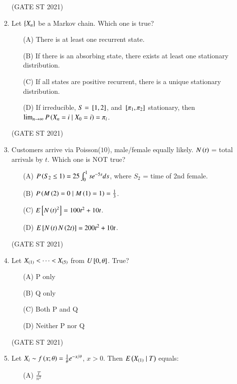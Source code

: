 \documentclass[journal,12pt,onecolumn]{IEEEtran}
\theoremstyle{remark}
\begin{document}
\begin{enumerate}
\hfill (GATE ST 2021) \\


\item
Let $\left\{X_n\right\}$ be a Markov chain. Which one is true?
\begin{enumerate}
\item[(A)] There is at least one recurrent state.
\item[(B)] If there is an absorbing state, there exists at least one stationary distribution.
\item[(C)] If all states are positive recurrent, there is a unique stationary distribution.
\item[(D)] If irreducible, $S = {}\left[1,2\right]$, and ${}\left[\pi_1,\pi_2\right]$ stationary, then $\lim_{n\to\infty} P\left(X_n=i \mid X_0=i\right) = \pi_i$.
\end{enumerate}

\hfill (GATE ST 2021) \\

\item
Customers arrive via Poisson($10$), male/female equally likely. $N\left(t\right)$ = total arrivals by $t$. Which one is NOT true?
\begin{enumerate}
\item[(A)] $P\left(S_2 \le 1\right) = 25 \int_0^1 s e^{-5s} ds$, where $S_2$ = time of 2nd female.
\item[(B)] $P\left(M\left(2\right) = 0 \mid M\left(1\right) = 1\right) = \frac13$.
\item[(C)] $E{}\left[N\left(t\right)^2\right]= 100t^2 + 10t$.
\item[(D)] $E{}\left[N\left(t\right)N\left(2t\right)\right] = 200t^2 + 10t$.
\end{enumerate}
\hfill (GATE ST 2021) \\

\item
Let $X_{\left(1\right)} < \dots < X_{\left(5\right)}$ from $U{}\left[0,\theta\right]$. True?
\begin{enumerate}
\item[(A)] P only
\item[(B)] Q only
\item[(C)] Both P and Q
\item[(D)] Neither P nor Q
\end{enumerate}
\hfill (GATE ST 2021) \\

\item
Let $X_i \sim f\left(x;\theta\right) = \frac{1}{\theta} e^{-x/\theta}$, $x>0$. Then $E\left(X_{\left(1\right)} \mid T\right)$ equals:
\begin{enumerate}
\item[(A)] $\frac{T}{n^2}$


\end{enumerate}
\end{enumerate}
\end{document}
